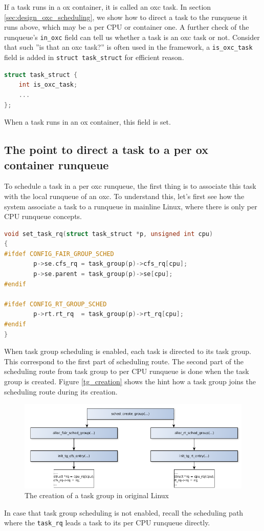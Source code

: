 If a task runs in a ox container, it is called an oxc task. 
In section \ref{sec:design_oxc_scheduling}, we show how to direct a task
to the runqueue it runs above, which may be a per CPU or container one.
A further check of the runqueue's \texttt{in\_oxc} field can tell us
whether a task is an oxc task or not. Consider that such ''is that an oxc
task?'' is often used in the framework, a \texttt{is\_oxc\_task} field is
added in \texttt{struct task\_struct} for efficient reason.
\begin{lstlisting}[language=C, caption={\texttt{is\_oxc\_task} field in 
						\texttt{struct task\_struct}}]
struct task_struct {
	int is_oxc_task;
	...
};
\end{lstlisting}
When a task runs in an ox container, this field is set.

\subsection{The point to direct a task to a per ox container runqueue}
To schedule a task in a per oxc runqueue, the first thing is to associate
this task with the local runqueue of an oxc. To understand this, let's
first see how the system associate a task to a runqueue in mainline Linux,
where there is only per CPU runqueue concepts. 
\begin{lstlisting}[language=C, 
	caption={To associate a task with a runqueue in original Linux}]
void set_task_rq(struct task_struct *p, unsigned int cpu)
{
#ifdef CONFIG_FAIR_GROUP_SCHED
        p->se.cfs_rq = task_group(p)->cfs_rq[cpu];
        p->se.parent = task_group(p)->se[cpu];
#endif

#ifdef CONFIG_RT_GROUP_SCHED
        p->rt.rt_rq  = task_group(p)->rt_rq[cpu];
#endif
}
\end{lstlisting}
When task group scheduling is enabled, each task is directed to its task group.
This correspond to the first part of scheduling route. The second part of 
the scheduling route from task group to per CPU runqueue is done when the 
task group is created. Figure \ref{tg_creation} shows the hint how a 
task group joins the scheduling route during its creation.
\begin{figure}[htbp]
        \centering
        \includegraphics[width=\textwidth]{images/tg_creation}
        \caption{The creation of a task group in original Linux}
        \label{fig:tg_creation}
\end{figure}
In case that task group scheduling is not enabled, recall the scheduling path
where the \texttt{task\_rq} leads a task to its per CPU runqueue directly.

